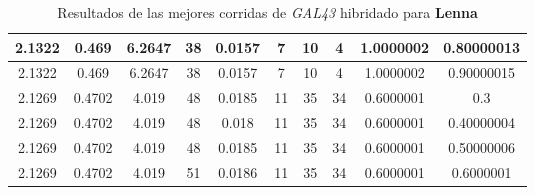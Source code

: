 \begin{table}[h!]
\begin{center}
\begin{tabular}{|c|c|c|c|c|c|c|c|c|c|}
        \hline
        \hline
            2.1322 & 0.469  & 6.2647 & 38 & 0.0157 & 7 & 10 & 4 & 1.0000002 & 0.80000013\\
        \hline
        \hline
            2.1322 & 0.469  & 6.2647 & 38 & 0.0157 & 7 & 10 & 4 & 1.0000002 & 0.90000015\\
        \hline
        \hline
            2.1269 & 0.4702  & 4.019 & 48 & 0.0185 & 11 & 35 & 34 & 0.6000001 & 0.3\\
        \hline
        \hline
            2.1269 & 0.4702  & 4.019 & 48 & 0.018 & 11 & 35 & 34 & 0.6000001 & 0.40000004\\
        \hline
        \hline
            2.1269 & 0.4702  & 4.019 & 48 & 0.0185 & 11 & 35 & 34 & 0.6000001 & 0.50000006\\
        \hline
        \hline
            2.1269 & 0.4702  & 4.019 & 51 & 0.0186 & 11 & 35 & 34 & 0.6000001 & 0.6000001\\
        \hline
        \end{tabular}
        \caption{Resultados de las mejores corridas de \emph{GAL43} hibridado para {\bf Lenna}}
        \label{tb:tableGAL43}
    \end{center}
\end{table}
